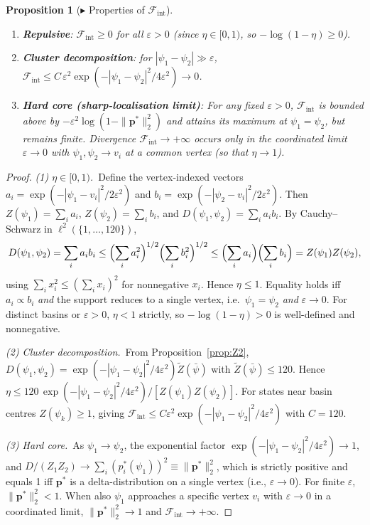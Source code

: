 \documentclass[12pt]{article}
\newtheorem{proposition}[theorem]{Proposition}
\newcommand{\Fcal}{\mathcal{F}}
\newcommand{\Fint}{\Fcal_{\mathrm{int}}}
\begin{document}
\begin{proposition}[$\blacktriangleright$ Properties of $\Fint$]\label{prop:Fint_props}
\begin{enumerate}
    \item \textbf{Repulsive}: $\Fint \geq 0$ for all $\varepsilon > 0$ (since $\eta \in [0,1)$, so $-\log(1 - \eta) \geq 0$).
    \item \textbf{Cluster decomposition}: for $|\psi_1 - \psi_2| \gg \varepsilon$,
    $\Fint \leq C\,\varepsilon^2\exp(-|\psi_1 - \psi_2|^2/4\varepsilon^2) \to 0$.
    \item \textbf{Hard core (sharp-localisation limit)}: For any fixed
    $\varepsilon > 0$, $\Fint$ is bounded above by
    $-\varepsilon^2 \log(1 - \|\mathbf{p}^*\|_2^2)$ and attains its
    maximum at $\psi_1 = \psi_2$, but remains finite. Divergence
    $\Fint \to +\infty$ occurs only in the coordinated limit
    $\varepsilon \to 0$ with $\psi_1, \psi_2 \to v_i$ at a common
    vertex (so that $\eta \to 1$).
\end{enumerate}
\end{proposition}

\begin{proof}
\textit{(1) $\eta \in [0,1)$.}\ Define the vertex-indexed vectors
$a_i = \exp(-|\psi_1 - v_i|^2/2\varepsilon^2)$ and
$b_i = \exp(-|\psi_2 - v_i|^2/2\varepsilon^2)$. Then
$Z(\psi_1) = \sum_i a_i$, $Z(\psi_2) = \sum_i b_i$, and
$D(\psi_1,\psi_2) = \sum_i a_i b_i$. By Cauchy--Schwarz in
$\ell^2(\{1,\ldots,120\})$,
\begin{equation}\label{eq:CS}
    D(\psi_1,\psi_2) = \sum_i a_i b_i
    \leq \Bigl(\sum_i a_i^2\Bigr)^{1/2}\Bigl(\sum_i b_i^2\Bigr)^{1/2}
    \leq \Bigl(\sum_i a_i\Bigr)\Bigl(\sum_i b_i\Bigr) = Z(\psi_1)Z(\psi_2),
\end{equation}
using $\sum_i x_i^2 \leq (\sum_i x_i)^2$ for nonnegative $x_i$. Hence
$\eta \leq 1$. Equality holds iff $a_i \propto b_i$ \textit{and} the
support reduces to a single vertex, i.e.\ $\psi_1 = \psi_2$ \textit{and}
$\varepsilon \to 0$. For distinct basins or $\varepsilon > 0$,
$\eta < 1$ strictly, so $-\log(1 - \eta) > 0$ is well-defined and
nonnegative.

\textit{(2) Cluster decomposition.}\ From Proposition~\ref{prop:Z2},
$D(\psi_1,\psi_2) = \exp(-|\psi_1 - \psi_2|^2/4\varepsilon^2)
\widetilde{Z}(\bar\psi)$ with $\widetilde{Z}(\bar\psi) \leq 120$. Hence
$\eta \leq 120\,\exp(-|\psi_1 - \psi_2|^2/4\varepsilon^2) /
[Z(\psi_1)Z(\psi_2)]$. For states near basin centres $Z(\psi_k) \geq 1$,
giving $\Fint \leq C\varepsilon^2 \exp(-|\psi_1 - \psi_2|^2/4\varepsilon^2)$
with $C = 120$.

\textit{(3) Hard core.}\ As $\psi_1 \to \psi_2$, the exponential factor
$\exp(-|\psi_1 - \psi_2|^2/4\varepsilon^2) \to 1$, and
$D/(Z_1 Z_2) \to \sum_i (p_i^*(\psi_1))^2 \equiv \|\mathbf{p}^*\|_2^2$,
which is strictly positive and equals 1 iff $\mathbf{p}^*$ is a
delta-distribution on a single vertex (i.e., $\varepsilon \to 0$). For
finite $\varepsilon$, $\|\mathbf{p}^*\|_2^2 < 1$. When also $\psi_1$
approaches a specific vertex $v_i$ with $\varepsilon \to 0$ in a
coordinated limit, $\|\mathbf{p}^*\|_2^2 \to 1$ and $\Fint \to +\infty$.
\end{proof}
\end{document}
